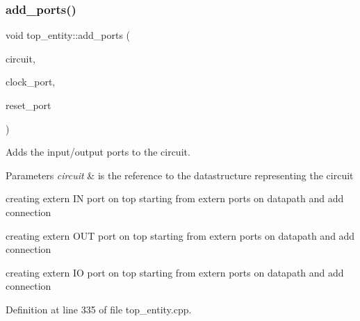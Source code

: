 \subsubsection{\texorpdfstring{add\+\_\+ports()}{add\_ports()}}
{\footnotesize\ttfamily void top\+\_\+entity\+::add\+\_\+ports (\begin{DoxyParamCaption}\item[{\hyperlink{structural__objects_8hpp_a8ea5f8cc50ab8f4c31e2751074ff60b2}{structural\+\_\+object\+Ref}}]{circuit,  }\item[{\hyperlink{structural__objects_8hpp_a8ea5f8cc50ab8f4c31e2751074ff60b2}{structural\+\_\+object\+Ref}}]{clock\+\_\+port,  }\item[{\hyperlink{structural__objects_8hpp_a8ea5f8cc50ab8f4c31e2751074ff60b2}{structural\+\_\+object\+Ref}}]{reset\+\_\+port }\end{DoxyParamCaption})\hspace{0.3cm}{\ttfamily [protected]}}



Adds the input/output ports to the circuit. 


\begin{DoxyParams}{Parameters}
{\em circuit} & is the reference to the datastructure representing the circuit \\
\hline
\end{DoxyParams}
creating extern IN port on top starting from extern ports on datapath and add connection

creating extern O\+UT port on top starting from extern ports on datapath and add connection

creating extern IO port on top starting from extern ports on datapath and add connection 

Definition at line 335 of file top\+\_\+entity.\+cpp.



